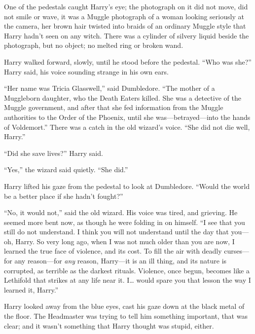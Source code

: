 One of the pedestals caught Harry's eye; the photograph on it did not
move, did not smile or wave, it was a Muggle photograph of a woman
looking seriously at the camera, her brown hair twisted into braids of
an ordinary Muggle style that Harry hadn't seen on any witch. There was
a cylinder of silvery liquid beside the photograph, but no object; no
melted ring or broken wand.

Harry walked forward, slowly, until he stood before the pedestal. ``Who
was she?'' Harry said, his voice sounding strange in his own ears.

``Her name was Tricia Glasswell,'' said Dumbledore. ``The mother of a
Muggleborn daughter, who the Death Eaters killed. She was a detective of
the Muggle government, and after that she fed information from the
Muggle authorities to the Order of the Phoenix, until she
was---betrayed---into the hands of Voldemort.'' There was a catch in the
old wizard's voice. ``She did not die well, Harry.''

``Did she save lives?'' Harry said.

``Yes,'' the wizard said quietly. ``She did.''

Harry lifted his gaze from the pedestal to look at Dumbledore. ``Would
the world be a better place if she hadn't fought?''

``No, it would not,'' said the old wizard. His voice was tired, and
grieving. He seemed more bent now, as though he were folding in on
himself. ``I see that you still do not understand. I think you will not
understand until the day that you---oh, Harry. So very long ago, when I
was not much older than you are now, I learned the true face of
violence, and its cost. To fill the air with deadly curses---for any
reason---for \emph{any} reason, Harry---it is an ill thing, and its
nature is corrupted, as terrible as the darkest rituals. Violence, once
begun, becomes like a Lethifold that strikes at any life near it.
I\ldots{} would spare you that lesson the way I learned it, Harry.''

Harry looked away from the blue eyes, cast his gaze down at the black
metal of the floor. The Headmaster was trying to tell him something
important, that was clear; and it wasn't something that Harry thought
was stupid, either.

